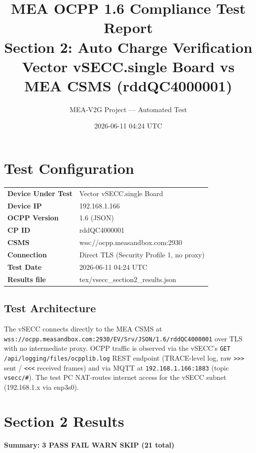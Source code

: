 \documentclass[10pt, a4paper]{article}
\title{\textbf{MEA OCPP 1.6 Compliance Test Report}\\[0.3em]
\large Section 2: Auto Charge Verification\\[0.3em]
\normalsize Vector vSECC.single Board vs MEA CSMS (rddQC4000001)}
\author{MEA-V2G Project --- Automated Test}
\date{2026-06-11 04:24 UTC}
\begin{document}
\maketitle
\tableofcontents
\newpage

\section{Test Configuration}
\begin{tabular}{ll}
\textbf{Device Under Test} & Vector vSECC.single Board \\
\textbf{Device IP}         & 192.168.1.166 \\
\textbf{OCPP Version}      & 1.6 (JSON) \\
\textbf{CP ID}             & rddQC4000001 \\
\textbf{CSMS}              & wss://ocpp.measandbox.com:2930 \\
\textbf{Connection}        & Direct TLS (Security Profile 1, no proxy) \\
\textbf{Test Date}         & 2026-06-11 04:24 UTC \\
\textbf{Results file}      & tex/vsecc\_section2\_results.json \\
\end{tabular}

\subsection*{Test Architecture}
The vSECC connects directly to the MEA CSMS at
\texttt{wss://ocpp.measandbox.com:2930/EV/Srv/JSON/1.6/rddQC4000001}
over TLS with no intermediate proxy.
OCPP traffic is observed via the vSECC's \texttt{GET /api/logging/files/ocpplib.log}
REST endpoint (TRACE-level log, raw \texttt{>>>} sent / \texttt{<<<} received frames)
and via MQTT at \texttt{192.168.1.166:1883} (topic \texttt{vsecc/\#}).
The test PC NAT-routes internet access for the vSECC subnet (192.168.1.x via enp3s0).

\section{Section 2 Results}
\textbf{Summary: 3 PASS  FAIL  WARN  SKIP \quad (21 total)}
\end{document}
